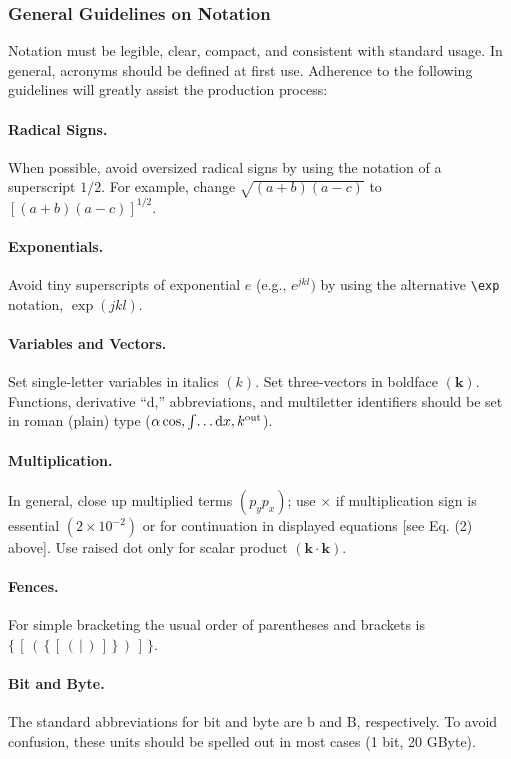 \documentclass[letterpaper,12pt]{article}   %
\begin{document}
\subsubsection{General Guidelines on Notation} Notation must be
legible, clear, compact, and consistent with standard usage. In
general, acronyms should be defined at first use. Adherence to the
following guidelines will greatly assist the production process:

\paragraph*{\bf Radical Signs.}
When possible, avoid oversized radical signs
by using the notation of a superscript $1/2$. For example, change
$\sqrt{(a + b)(a - c)}$ to $[(a + b)(a - c)]^{1/2}$.

\paragraph*{\bf Exponentials.} Avoid tiny superscripts of exponential $e$ (e.g.,
$e^{jkl})$ by using the alternative \verb+\exp+ notation,
$\exp(jkl)$.

\paragraph*{\bf Variables and Vectors.}
Set single-letter variables in italics $(k)$. Set three-vectors in
boldface $(\mathbf{k})$. Functions, derivative ``d,''
abbreviations, and multiletter identifiers should be set in roman
(plain) type  ($\alpha \cos, \int\!\dots{\rm d}x, k^{\rm out}$).

\paragraph*{\bf Multiplication.}
In general, close up multiplied terms $(p_yp_x)$;
use $\times$ if multiplication sign is essential $(2 \times
10^{-2})$ or for continuation in displayed equations [see Eq. (2)
above]. Use raised dot only for scalar product $(\mathbf{k \cdot
k})$.

\paragraph*{\bf Fences.}
For simple bracketing the usual order of parentheses and brackets
is $\{ \, [  \, (  \,  \{  \, [  \, (  \, |  \, )  \, ]  \, \} \,
)  \, ]  \, \}$.

\paragraph*{\bf Bit and Byte.}
The standard abbreviations for bit
and byte are b and B, respectively. To avoid confusion, these
units should be spelled out in most cases (1 bit, 20 GByte).
\end{document}
